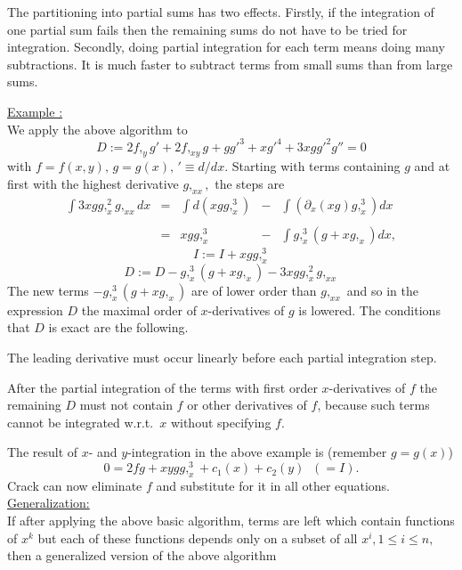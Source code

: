 \documentclass[12pt]{article}
\begin{document}
The partitioning into partial sums has two effects. Firstly, if the
integration of one partial sum fails then the remaining sums do not have
to be tried for integration. Secondly, doing partial integration for
each term means doing many subtractions. It is much faster to subtract
terms from small sums than from large sums.

\underline{Example :} \\
We apply the above algorithm to
\begin{equation}
D := 2f,_yg' + 2f,_{xy}g + gg'^3 + xg'^4 + 3xgg'^2g'' = 0
\label{D}
\end{equation}
with $f = f(x,y), \, g = g(x), \, '\equiv d/dx.$
Starting with terms containing $g$
and at first with the highest derivative $g,_{xx},$ the steps are
\[
\begin{array}{rcccl}
\int 3xgg,_x^2g,_{xx} dx 
& = & \int d(xgg,_x^3)
    & - & \int \left( \partial_x(xg) g,_x^3\right) dx \\ \\
& = & xgg,_x^3 & - & \int g,_x^3(g + xg,_x) dx,
\end{array} \]
\[ I := I + xgg,_x^3 \]
\[ D := D - g,_x^3(g + xg,_x) - 3xgg,_x^2g,_{xx} \]
The new terms $- g,_x^3(g + xg,_x)$ are of lower order than $g,_{xx}$ 
and so in the expression $D$ the maximal order of $x$-derivatives 
of $g$ is lowered. The conditions that $D$ is exact are the following.
\begin{description}
\item The leading derivative must occur linearly before each partial
integration step. 
\item After the partial integration of the terms with first order
$x$-derivatives of $f$ the remaining $D$ must not contain $f$ 
or other derivatives of $f$, because such terms cannot
be integrated w.r.t.\ $x$ without specifying $f$.
\end{description}
The result of $x$- and $y$-integration in the above example is
(remember $g=g(x)$)
\begin{equation}
0 = 2fg + xygg,_x^3 + c_1(x) + c_2(y) \; \; (=I). \nonumber
\end{equation}
{\sc Crack} can now eliminate $f$ and substitute
for it in all other equations. \\
\underline{Generalization:} \\
If after applying the above basic algorithm, terms are left which contain
functions of $x^k$ but each of these functions depends only on a subset of
all $x^i, 1\leq i\leq n,$ then a generalized version of the above algorithm
\end{document}
